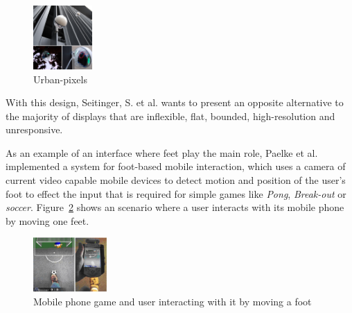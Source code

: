 \begin{figure}[h!]
	\centering
	\includegraphics[width=0.2\textwidth, clip=true, keepaspectratio=true]{./pic/urban-pixels.png}
	\caption{Urban-pixels}
	\label{fig:urban-pixels}
\end{figure}

With this design, Seitinger, S. et al. \cite{seitinger-2} wants to present an opposite alternative to the majority of displays that are inflexible, flat, bounded, high-resolution and unresponsive. 

As an example of an interface where feet play the main role, Paelke et al. \cite{paelke} implemented a system for foot-based mobile interaction, which uses a camera of current video capable mobile devices to detect motion and position of the user’s foot to effect the input
that is required for simple games like \emph{Pong}, \emph{Break-out} or \emph{soccer}. Figure~\ref{fig:feet-based-game} shows an scenario where a user interacts with its mobile phone by moving one feet. 

\begin{figure}[h!]
	\centering
	\includegraphics[width=0.25\textwidth, clip=true, keepaspectratio=true]{./pic/foot-based-game.png}
	\caption{Mobile phone game and user interacting with it by moving a foot}
	\label{fig:feet-based-game}
\end{figure}
